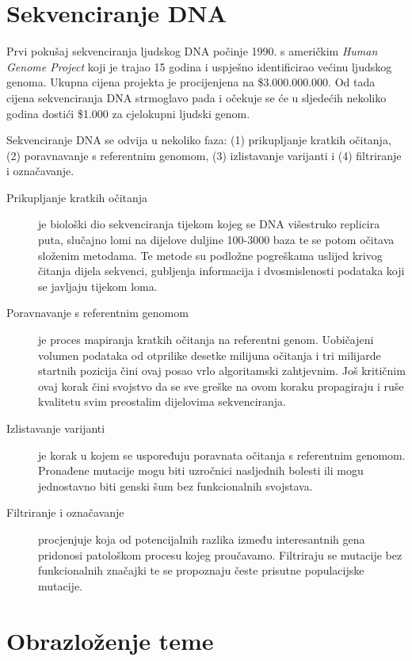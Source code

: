 \documentclass[times, utf8, diplomski]{fer}
\begin{document}
\section{Sekvenciranje DNA}

Prvi pokušaj sekvenciranja ljudskog DNA počinje 1990. s američkim \emph{Human Genome Project} koji je trajao 15
godina i uspješno identificirao većinu ljudskog genoma. Ukupna cijena projekta je procijenjena na \$3.000.000.000.
\cite{genomefaq}
Od tada cijena sekvenciranja DNA strmoglavo pada i očekuje se će u sljedećih nekoliko godina dostići \$1.000 za
cjelokupni ljudski genom.

Sekvenciranje DNA se odvija u nekoliko faza: (1) prikupljanje kratkih očitanja, (2) poravnavanje s referentnim genomom, (3) izlistavanje varijanti i (4) filtriranje i označavanje.

\begin{description}
\item[Prikupljanje kratkih očitanja] je biološki dio sekvenciranja tijekom kojeg se DNA višestruko replicira puta, slučajno lomi na dijelove duljine 100-3000 baza te se potom očitava složenim metodama. Te metode su podložne pogreškama uslijed krivog čitanja dijela sekvenci, gubljenja informacija i dvosmislenosti podataka koji se javljaju tijekom loma.

\item[Poravnavanje s referentnim genomom] je proces mapiranja kratkih očitanja na referentni genom. Uobičajeni volumen podataka od otprilike desetke milijuna očitanja i tri milijarde startnih pozicija čini ovaj posao vrlo
algoritamski zahtjevnim. Još kritičnim ovaj korak čini svojstvo da se sve greške na ovom koraku propagiraju i
ruše kvalitetu svim preostalim dijelovima sekvenciranja.

\item [Izlistavanje varijanti] je korak u kojem se uspoređuju poravnata očitanja s referentnim genomom. Pronađene
mutacije mogu biti uzročnici nasljednih bolesti ili mogu jednostavno biti genski šum bez funkcionalnih svojstava.

\item [Filtriranje i označavanje] procjenjuje koja od potencijalnih razlika između interesantnih gena pridonosi 
patološkom procesu kojeg proučavamo. Filtriraju se mutacije bez funkcionalnih značajki te se propoznaju česte prisutne populacijske mutacije.
\end{description}

\section{Obrazloženje teme}
\end{document}

